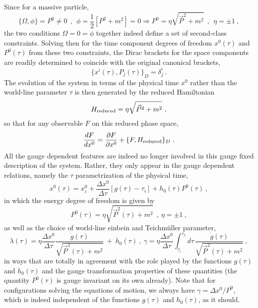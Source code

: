 \documentclass[a4paper,11pt]{article}
\begin{document}
Since for a massive particle,
\begin{equation}
\{\Omega,\phi\}=P^0\neq 0\ \ ,\ \ 
\phi=\frac{1}{2}\left[P^2+m^2\right]=0\Rightarrow P^0=\eta\sqrt{\vec{P}^2+m^2}
\ \ ,\ \ \eta=\pm 1\ ,
\end{equation}
the two conditions $\Omega=0=\phi$ together indeed define a set of
second-class constraints. Solving then for the time component degrees
of freedom $x^0(\tau)$ and $P^0(\tau)$ from these two constraints,
the Dirac brackets for the space components are readily determined
to coincide with the original canonical brackets,
\begin{equation}
\{x^i(\tau),P_j(\tau)\}_D=\delta^i_j\ .
\end{equation}
The evolution of the system in terms of the physical
time $x^0$ rather than the world-line parameter $\tau$ is then generated
by the reduced Hamiltonian
\begin{equation}
H_{\rm reduced}=\eta\sqrt{\vec{P}^2+m^2}\ ,
\end{equation}
so that for any observable $F$ on this reduced phase space,
\begin{equation}
\frac{dF}{dx^0}=\frac{\partial F}{\partial x^0}+\{F,H_{\rm reduced}\}_D\ .
\end{equation}
All the gauge dependent features are indeed no longer involved in this
gauge fixed description of the system. Rather, they only appear in the
gauge dependent relations, namely the $\tau$ parametrization of the
physical time,
\begin{equation}
x^0(\tau)=x^0_i+\frac{\Delta x^0}{\Delta\tau}\left[g(\tau)-\tau_i\right]+
h_0(\tau)P^0(\tau)\ ,
\end{equation}
in which the energy degree of freedom is given by
\begin{equation}
P^0(\tau)=\eta\sqrt{\vec{P}^2(\tau)+m^2}\ \ ,\ \eta=\pm 1\ ,
\end{equation}
as well as the choice of world-line einbein and Teichm\"uller parameter,
\begin{equation}
\lambda(\tau)=\eta\frac{\Delta x^0}{\Delta\tau}
\frac{\dot{g}(\tau)}{\sqrt{\vec{P}^2(\tau)+m^2}}\ +\ \dot{h}_0(\tau)\ ,\ 
\gamma=\eta\frac{\Delta x^0}{\Delta\tau}\int_{\tau_i}^{\tau_f}d\tau\,
\frac{\dot{g}(\tau)}{\sqrt{\vec{P}^2(\tau)+m^2}}\ ,
\end{equation}
in ways that are totally in agreement with the role played by the functions
$g(\tau)$ and $h_0(\tau)$ and the gauge transformation properties of these
quantities (the quantity $P^0(\tau)$ is gauge invariant on its own already).
Note that for configurations solving the equations of motion, we always
have $\gamma=\Delta x^0/P^0$, which is indeed independent of the functions
$g(\tau)$ and $h_0(\tau)$, as it should.
\end{document}
